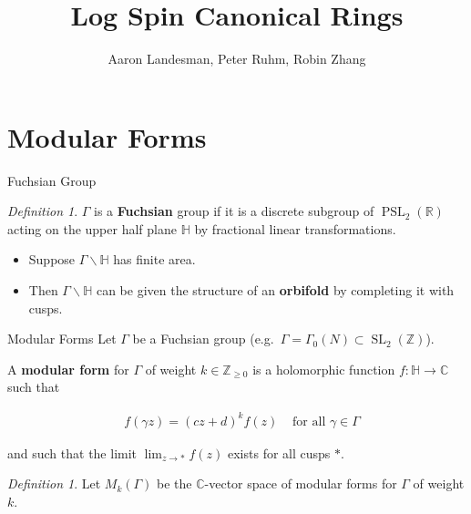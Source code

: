 \documentclass{beamer}
\title{Log Spin Canonical Rings}
\author{Aaron Landesman\inst{1}, Peter Ruhm\inst{2}, Robin Zhang\inst{3}}
\institute[] %
{
  \inst{1}
	Harvard University
	,
  \inst{2}
	Stanford University
  ,
  \inst{3}
	Stanford University
}
\theoremstyle{remark}
\newtheorem{defn}[thm]{Definition}
\newcommand\BH{{\mathbb H}}
\newcommand\BC{{\mathbb C}}
\newcommand\BR{{\mathbb R}}
\newcommand\BZ{{\mathbb Z}}
\newcommand{\SL}{\operatorname{SL}}
\newcommand{\PSL}{\operatorname{PSL}}
\begin{document}
\begin{frame}
	\titlepage
\end{frame}

\section{Modular Forms} 

\begin{frame}{Fuchsian Group}

\begin{defn}
$\Gamma$ is a {\bf Fuchsian} group if it is a discrete subgroup of
$\PSL_2(\BR)$ acting on the upper half plane $\BH$ by fractional
linear transformations.
\end{defn}

\pause
\begin{itemize}
\item Suppose $\Gamma \backslash \BH$ has finite area. \\
\pause
\item Then $\Gamma \backslash \BH$ can be given the structure of an {\bf{orbifold}} by completing it with cusps.  
\end{itemize}

\end{frame}


\begin{frame}{Modular Forms}
Let $\Gamma$  be a Fuchsian group (e.g.~$\Gamma = \Gamma_0(N) \subset \SL_2(\BZ)$).

\pause
\begin{definition}
A \textbf{modular form} for $\Gamma$ of weight $k \in \BZ_{\geq 0}$ is a holomorphic function $f \colon \BH \to \BC$ such that

\begin{align*}
	&f(\gamma z) = (cz+d)^k f(z) &\text{ for all } \gamma \in \Gamma 
\end{align*}

\noindent
and such that the limit $\lim_{z \to *} f(z)$ exists for all cusps $*$.
\end{definition}

\pause
\begin{defn}
  Let $M_k(\Gamma)$ be the $\BC$-vector space of modular forms for $\Gamma$ of weight $k$.    
\end{defn}

\end{frame}
\end{document}

